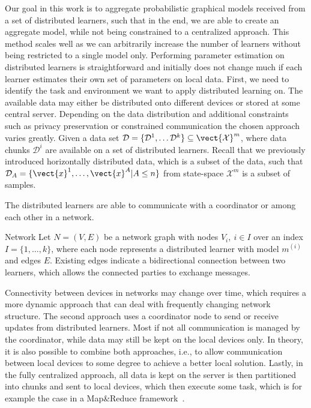 Our goal in this work is to aggregate probabilistic graphical models received from a set of distributed learners, such that in the end, we are able to create an aggregate model, while not being constrained to a centralized approach.
This method scales well as we can arbitrarily increase the number of learners without being restricted to a single model only.
Performing parameter estimation on distributed learners is straightforward and initially does not change much if each learner estimates their own set of parameters on local data.
First, we need to identify the task and environment we want to apply distributed learning on.
The available data may either be distributed onto different devices or stored at some central server.
Depending on the data distribution and additional constraints such as privacy preservation or constrained communication the chosen approach varies greatly.
Given a data set $\mathcal{D} = \{\mathcal{D}^1, \ldots \mathcal{D}^k\} \subseteq \vect{\mathcal{X}}^m$,
where data chunks $\mathcal{D}^i$ are available on a set of distributed learners.
Recall that we previously introduced horizontally distributed data, which is a subset of the data, such that $\mathcal{D}_{A} = \{\vect{x}^1, \ldots, \vect{x}^A \lvert A \leq n\}$ from state-space $\mathcal{X}^m$ is a subset of samples.

The distributed learners are able to communicate with a coordinator or among each other in a network.

\begin{definition}{Network}
    Let $N = (V, E)$ be a network graph with nodes $V_i, \: i \in I$ over an index $I=\{1,\ldots,k\}$, where each node represents a distributed learner with model $m^{(i)}$ and edges $E$. 
    Existing edges indicate a bidirectional connection between two learners, which allows the connected parties to exchange messages.
\end{definition}

Connectivity between devices in networks may change over time, which requires a more dynamic approach that can deal with frequently changing network structure.
The second approach uses a coordinator node to send or receive updates from distributed learners. 
Most if not all communication is managed by the coordinator, while data may still be kept on the local devices only.
In theory, it is also possible to combine both approaches, i.e., to allow communication between local devices to some degree to achieve a better local solution.
Lastly, in the fully centralized approach, all data is kept on the server is then partitioned into chunks and sent to local devices, which then execute some task, which is for example the case in a Map\&Reduce framework~\cite{dean2010mapreduce}.


